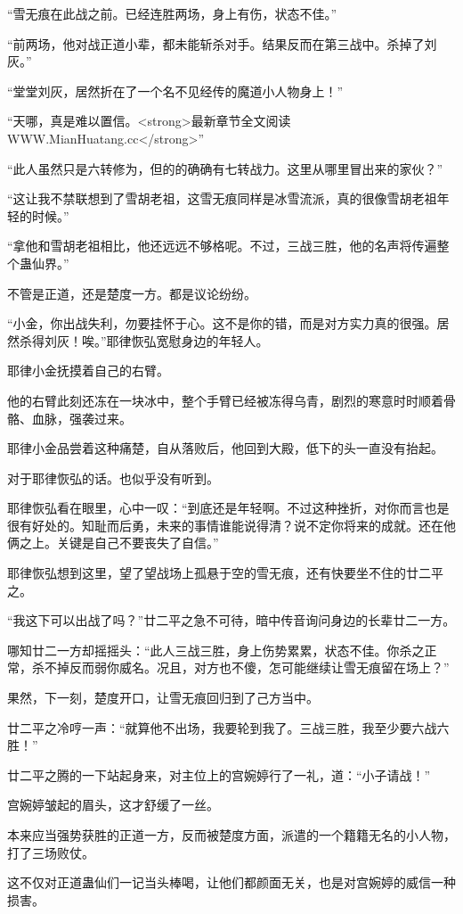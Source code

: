 \begin{this_body}
“雪无痕在此战之前。已经连胜两场，身上有伤，状态不佳。”

“前两场，他对战正道小辈，都未能斩杀对手。结果反而在第三战中。杀掉了刘灰。”

“堂堂刘灰，居然折在了一个名不见经传的魔道小人物身上！”

“天哪，真是难以置信。<strong>最新章节全文阅读WWW.MianHuatang.cc</strong>”

“此人虽然只是六转修为，但的的确确有七转战力。这里从哪里冒出来的家伙？”

“这让我不禁联想到了雪胡老祖，这雪无痕同样是冰雪流派，真的很像雪胡老祖年轻的时候。”

“拿他和雪胡老祖相比，他还远远不够格呢。不过，三战三胜，他的名声将传遍整个蛊仙界。”

不管是正道，还是楚度一方。都是议论纷纷。

“小金，你出战失利，勿要挂怀于心。这不是你的错，而是对方实力真的很强。居然杀得刘灰！唉。”耶律恢弘宽慰身边的年轻人。

耶律小金抚摸着自己的右臂。

他的右臂此刻还冻在一块冰中，整个手臂已经被冻得乌青，剧烈的寒意时时顺着骨骼、血脉，强袭过来。

耶律小金品尝着这种痛楚，自从落败后，他回到大殿，低下的头一直没有抬起。

对于耶律恢弘的话。也似乎没有听到。

耶律恢弘看在眼里，心中一叹：“到底还是年轻啊。不过这种挫折，对你而言也是很有好处的。知耻而后勇，未来的事情谁能说得清？说不定你将来的成就。还在他俩之上。关键是自己不要丧失了自信。”

耶律恢弘想到这里，望了望战场上孤悬于空的雪无痕，还有快要坐不住的廿二平之。

“我这下可以出战了吗？”廿二平之急不可待，暗中传音询问身边的长辈廿二一方。

哪知廿二一方却摇摇头：“此人三战三胜，身上伤势累累，状态不佳。你杀之正常，杀不掉反而弱你威名。况且，对方也不傻，怎可能继续让雪无痕留在场上？”

果然，下一刻，楚度开口，让雪无痕回归到了己方当中。

廿二平之冷哼一声：“就算他不出场，我要轮到我了。三战三胜，我至少要六战六胜！”

廿二平之腾的一下站起身来，对主位上的宫婉婷行了一礼，道：“小子请战！”

宫婉婷皱起的眉头，这才舒缓了一丝。

本来应当强势获胜的正道一方，反而被楚度方面，派遣的一个籍籍无名的小人物，打了三场败仗。

这不仅对正道蛊仙们一记当头棒喝，让他们都颜面无关，也是对宫婉婷的威信一种损害。


\end{this_body}
